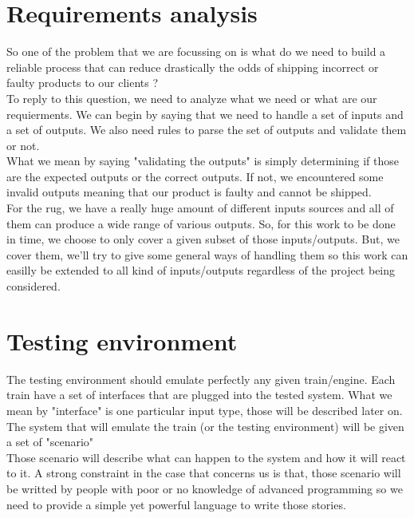 \documentclass[12pt]{article}
\begin{document}
\clearpage
\section{Requirements analysis}

So one of the problem that we are focussing on is what do we need to build a reliable process that can reduce drastically the odds of shipping incorrect or faulty products to our clients ?\\

To reply to this question, we need to analyze what we need or what are our requierments. We can begin by saying that we need to handle a set of inputs and a set of outputs. We also need rules to parse the set of outputs and validate them or not.\\

What we mean by saying "validating the outputs" is simply determining if those are the expected outputs or the correct outputs. If not, we encountered some invalid outputs meaning that our product is faulty and cannot be shipped.\\

For the \gls{rug}, we have a really huge amount of different inputs sources and all of them can produce a wide range of various outputs. So, for this work to be done in time, we choose to only cover a given subset of those inputs/outputs. But, we cover them, we'll try to give some general ways of handling them so this work can easilly be extended to all kind of inputs/outputs regardless of the project being considered.


\section{Testing environment}

The testing environment should emulate perfectly any given train/engine. Each train have a set of interfaces that are plugged into the tested system. What we mean by "interface" is one particular input type, those will be described later on. The system that will emulate the train (or the testing environment) will be given a set of "scenario"\\

Those scenario will describe what can happen to the system and how it will react to it. A strong constraint in the case that concerns us is that, those scenario will be writted by people with poor or no knowledge of advanced programming so we need to provide a simple yet powerful language to write those stories.\\
\end{document}
